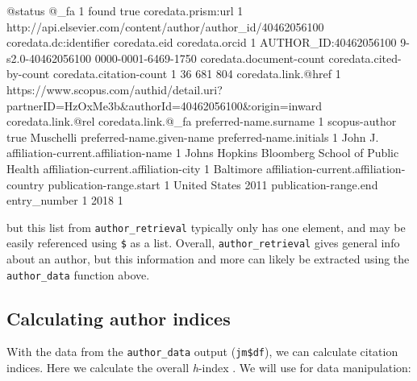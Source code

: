 \begin{Schunk}
\begin{Soutput}
  @status @_fa
1   found true
                                            coredata.prism:url
1 http://api.elsevier.com/content/author/author_id/40462056100
  coredata.dc:identifier       coredata.eid      coredata.orcid
1  AUTHOR_ID:40462056100 9-s2.0-40462056100 0000-0001-6469-1750
  coredata.document-count coredata.cited-by-count coredata.citation-count
1                      36                     681                     804
                                                                             coredata.link.@href
1 https://www.scopus.com/authid/detail.uri?partnerID=HzOxMe3b&authorId=40462056100&origin=inward
  coredata.link.@rel coredata.link.@_fa preferred-name.surname
1      scopus-author               true              Muschelli
  preferred-name.given-name preferred-name.initials
1                      John                      J.
             affiliation-current.affiliation-name
1 Johns Hopkins Bloomberg School of Public Health
  affiliation-current.affiliation-city
1                            Baltimore
  affiliation-current.affiliation-country publication-range.start
1                           United States                    2011
  publication-range.end entry_number
1                  2018            1
\end{Soutput}
\end{Schunk}

but this list from \texttt{author\_retrieval} typically only has one
element, and may be easily referenced using \texttt{\$} as a list.
Overall, \texttt{author\_retrieval} gives general info about an author,
but this information and more can likely be extracted using the
\texttt{author\_data} function above.

\hypertarget{calculating-author-indices}{%
\subsection{Calculating author
indices}\label{calculating-author-indices}}

With the data from the \texttt{author\_data} output (\texttt{jm\$df}),
we can calculate citation indices. Here we calculate the overall
\emph{h}-index \citep{hirsch2005index}. We will use 
\citep{dplyr} for data manipulation:

